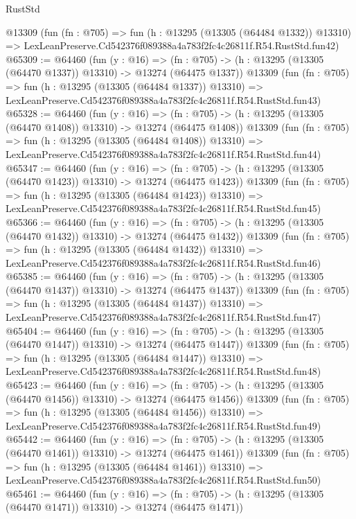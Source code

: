 \begin{lexlean}{RustStd}
\begin{coremodule}
    @13309
    (fun (fn : @705) =>
    fun (h : @13295 (@13305 (@64484 @1332)) @13310) =>
    LexLeanPreserve.Cd542376f089388a4a783f2fc4c26811f.R54.RustStd.fun42)
@65309 := @64460
    (fun (y : @16) =>
    (fn : @705) -> (h : @13295 (@13305 (@64470 @1337)) @13310) -> @13274 (@64475 @1337))
    @13309
    (fun (fn : @705) =>
    fun (h : @13295 (@13305 (@64484 @1337)) @13310) =>
    LexLeanPreserve.Cd542376f089388a4a783f2fc4c26811f.R54.RustStd.fun43)
@65328 := @64460
    (fun (y : @16) =>
    (fn : @705) -> (h : @13295 (@13305 (@64470 @1408)) @13310) -> @13274 (@64475 @1408))
    @13309
    (fun (fn : @705) =>
    fun (h : @13295 (@13305 (@64484 @1408)) @13310) =>
    LexLeanPreserve.Cd542376f089388a4a783f2fc4c26811f.R54.RustStd.fun44)
@65347 := @64460
    (fun (y : @16) =>
    (fn : @705) -> (h : @13295 (@13305 (@64470 @1423)) @13310) -> @13274 (@64475 @1423))
    @13309
    (fun (fn : @705) =>
    fun (h : @13295 (@13305 (@64484 @1423)) @13310) =>
    LexLeanPreserve.Cd542376f089388a4a783f2fc4c26811f.R54.RustStd.fun45)
@65366 := @64460
    (fun (y : @16) =>
    (fn : @705) -> (h : @13295 (@13305 (@64470 @1432)) @13310) -> @13274 (@64475 @1432))
    @13309
    (fun (fn : @705) =>
    fun (h : @13295 (@13305 (@64484 @1432)) @13310) =>
    LexLeanPreserve.Cd542376f089388a4a783f2fc4c26811f.R54.RustStd.fun46)
@65385 := @64460
    (fun (y : @16) =>
    (fn : @705) -> (h : @13295 (@13305 (@64470 @1437)) @13310) -> @13274 (@64475 @1437))
    @13309
    (fun (fn : @705) =>
    fun (h : @13295 (@13305 (@64484 @1437)) @13310) =>
    LexLeanPreserve.Cd542376f089388a4a783f2fc4c26811f.R54.RustStd.fun47)
@65404 := @64460
    (fun (y : @16) =>
    (fn : @705) -> (h : @13295 (@13305 (@64470 @1447)) @13310) -> @13274 (@64475 @1447))
    @13309
    (fun (fn : @705) =>
    fun (h : @13295 (@13305 (@64484 @1447)) @13310) =>
    LexLeanPreserve.Cd542376f089388a4a783f2fc4c26811f.R54.RustStd.fun48)
@65423 := @64460
    (fun (y : @16) =>
    (fn : @705) -> (h : @13295 (@13305 (@64470 @1456)) @13310) -> @13274 (@64475 @1456))
    @13309
    (fun (fn : @705) =>
    fun (h : @13295 (@13305 (@64484 @1456)) @13310) =>
    LexLeanPreserve.Cd542376f089388a4a783f2fc4c26811f.R54.RustStd.fun49)
@65442 := @64460
    (fun (y : @16) =>
    (fn : @705) -> (h : @13295 (@13305 (@64470 @1461)) @13310) -> @13274 (@64475 @1461))
    @13309
    (fun (fn : @705) =>
    fun (h : @13295 (@13305 (@64484 @1461)) @13310) =>
    LexLeanPreserve.Cd542376f089388a4a783f2fc4c26811f.R54.RustStd.fun50)
@65461 := @64460
    (fun (y : @16) =>
    (fn : @705) -> (h : @13295 (@13305 (@64470 @1471)) @13310) -> @13274 (@64475 @1471))

\end{coremodule}
\end{lexlean}
